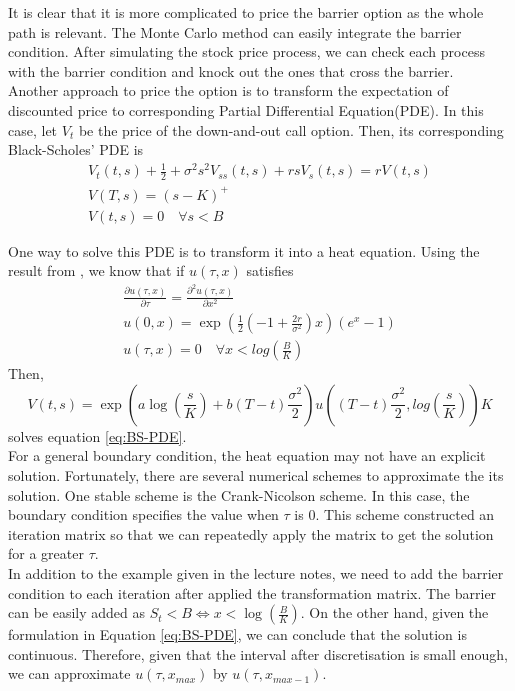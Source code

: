\documentclass[a4paper,11pt]{article}
\begin{document}
It is clear that it is more complicated to price the barrier option as the whole path is relevant. The Monte Carlo method can easily integrate the barrier condition. After simulating the stock price process, we can check each process with the barrier condition and knock out the ones that cross the barrier.\\

Another approach to price the option is to transform the expectation of discounted price to corresponding Partial Differential Equation(PDE). In this case, let $V_t$ be the price of the down-and-out call option. Then, its corresponding Black-Scholes' PDE \citep[p. 79]{Veraart2014} is
\begin{gather}
	V_t(t,s) + \frac{1}{2} + \sigma^2 s^2 V_{ss}(t,s) + rsV_s(t,s) = rV(t,s)\nonumber\\
	V(T,s) = (s-K)^+\\
	V(t,s) = 0 \quad \forall s < B\nonumber
	\label{eq:BS-PDE}
\end{gather}

One way to solve this PDE is to transform it into a heat equation. Using the result from \citet[p. 79]{Veraart2014}
, we know that if $u(\tau, x)$ satisfies
\begin{gather}
	\frac{\partial u(\tau,x)}{\partial \tau} = \frac{\partial^2 u(\tau,x)}{\partial x^2}\nonumber\\
	u(0,x) = \exp(\frac{1}{2}(-1+\frac{2r}{\sigma^2})x)(e^x-1)\\
	u(\tau, x) = 0 \quad \forall x < log(\frac{B}{K})\nonumber
\label{eq:heat_equation}
\end{gather}
Then, 
\begin{equation}
	V(t,s) = \exp(a\log(\frac{s}{K})+b(T-t)\frac{\sigma^2}{2})u\left((T-t )\frac{\sigma^2}{2}, log(\frac{s}{K}) \right)K
	\label{eq:BS-PDE_solution}
\end{equation}
solves equation \ref{eq:BS-PDE}.\\

For a general boundary condition, the heat equation may not have an explicit solution. Fortunately, there are several numerical schemes to approximate the its solution. One stable scheme is the Crank-Nicolson scheme\citep[p.88]{Veraart2014}.  In this case, the boundary condition specifies the value when $\tau$ is 0. This scheme constructed an iteration matrix so that we can repeatedly apply the matrix to get the solution for a greater $\tau$. \\

In addition to the example given in the lecture notes, we need to add the barrier condition to each iteration after applied the transformation matrix. The barrier can be easily added as $S_t < B \iff x < \log(\frac{B}{K})$. On the other hand, given the formulation in Equation \ref{eq:BS-PDE}, we can conclude that the solution is continuous. Therefore, given that the interval after discretisation is small enough, we can approximate $u(\tau,x_{max})$ by $u(\tau,x_{max-1})$. \\
\end{document}
